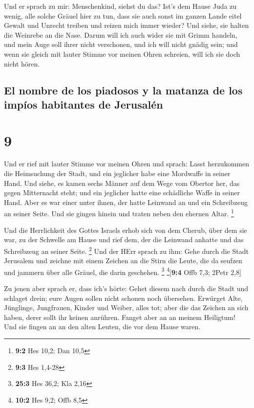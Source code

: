  Und er sprach zu mir: Menschenkind, siehst du das? Ist's
dem Hause Juda zu wenig, alle solche Gräuel hier zu tun, dass sie auch
sonst im ganzen Lande eitel Gewalt und Unrecht treiben und reizen mich
immer wieder? Und siehe, sie halten die Weinrebe an die Nase.
 Darum will ich auch wider sie mit Grimm handeln, und
mein Auge soll ihrer nicht verschonen, und ich will nicht gnädig sein;
und wenn sie gleich mit lauter Stimme vor meinen Ohren schreien, will
ich sie doch nicht hören.

\hypertarget{el-nombre-de-los-piadosos-y-la-matanza-de-los-impuxedos-habitantes-de-jerusaluxe9n}{%
\subsection{El nombre de los piadosos y la matanza de los impíos
habitantes de
Jerusalén}\label{el-nombre-de-los-piadosos-y-la-matanza-de-los-impuxedos-habitantes-de-jerusaluxe9n}}

\hypertarget{section-8}{%
\section{9}\label{section-8}}

 Und er rief mit lauter Stimme vor meinen Ohren und
sprach: Lasst herzukommen die Heimsuchung der Stadt, und ein jeglicher
habe eine Mordwaffe in seiner Hand.  Und siehe, es kamen
sechs Männer auf dem Wege vom Obertor her, das gegen Mitternacht steht;
und ein jeglicher hatte eine schädliche Waffe in seiner Hand. Aber es
war einer unter ihnen, der hatte Leinwand an und ein Schreibzeug an
seiner Seite. Und sie gingen hinein und traten neben den ehernen Altar.
\footnote{\textbf{9:2} Hes 10,2; Dan 10,5}

 Und die Herrlichkeit des Gottes Israels erhob sich von
dem Cherub, über dem sie war, zu der Schwelle am Hause und rief dem, der
die Leinwand anhatte und das Schreibzeug an seiner Seite. \footnote{\textbf{9:3}
  Hes 1,4-28}  Und der HErr sprach zu ihm: Gehe durch die
Stadt Jerusalem und zeichne mit einem Zeichen an die Stirn die Leute,
die da seufzen und jammern über alle Gräuel, die darin geschehen.
\footnote{\textbf{25:3} Hes 36,2; Kla 2,16} \footnote{\textbf{10:2} Hes
  9,2; Offb 8,5}{[}\textbf{9:4} Offb 7,3; 2Petr 2,8{]}

 Zu jenen aber sprach er, dass ich's hörte: Gehet diesem
nach durch die Stadt und schlaget drein; eure Augen sollen nicht schonen
noch übersehen.  Erwürget Alte, Jünglinge, Jungfrauen,
Kinder und Weiber, alles tot; aber die das Zeichen an sich haben, derer
sollt ihr keinen anrühren. Fanget aber an an meinem Heiligtum! Und sie
fingen an an den alten Leuten, die vor dem Hause waren.

